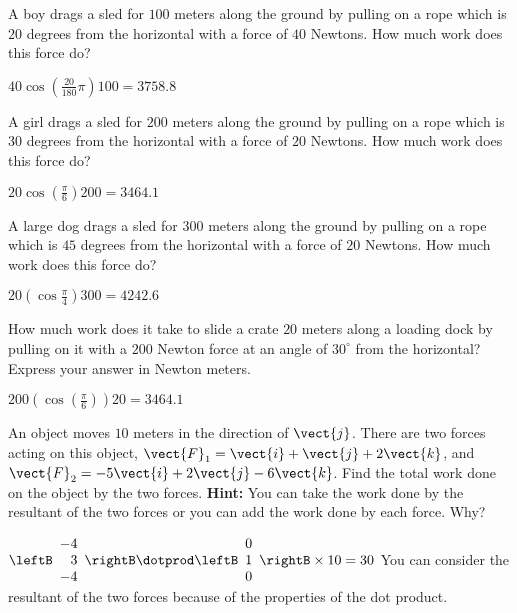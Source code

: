 \begin{enumialphparenastyle}

\begin{ex} A boy drags a sled for $100$ meters along the ground by pulling on a rope
which is $20$ degrees from the horizontal with a force of $40$ Newtons. How much
work does this force do?
\begin{sol}
$40\cos \left( \frac{20}{180}\pi \right)100=3758.8  $
\end{sol}
\end{ex}

\begin{ex} A girl drags a sled for $200$ meters along the ground by pulling on a rope
which is $30$ degrees from the horizontal with a force of $20$ Newtons. How much
work does this force do?
\begin{sol}
$20\cos \left( \frac{\pi }{6}\right)200= 3464.1 $
\end{sol}
\end{ex}

\begin{ex} A large dog drags a sled for $300$ meters along the ground by pulling on a
rope which is $45$ degrees from the horizontal with a force of $20$ Newtons. How
much work does this force do?
\begin{sol}
 $20\left( \cos \frac{\pi }{4}\right)300=4242.6 $
\end{sol}
\end{ex}

\begin{ex} How much work does it take to slide a crate $20$ meters
along a loading dock by pulling on it with a $200$ Newton force at an angle of
$30^{\circ }$ from the horizontal? Express your answer in Newton meters. 
\begin{sol}
$200\left( \cos \left( \frac{\pi }{6}\right) \right) 20= 3464.1$
\end{sol}
\end{ex}

\begin{ex} An object moves $10$ meters in the direction of $\vect{j}$. There are
two forces acting on this object, $\vect{F}_{1}=\vect{i}+\vect{j}+
2\vect{k}$, and $\vect{F}_{2}=-5\vect{i}+2\vect{j}-6\vect{k}$. Find
the total work done on the object by the two forces. \textbf{Hint: }You can
take the work done by the resultant of the two forces or you can add the
work done by each force. Why?
\begin{sol}
 $\leftB \begin{array}{r}
 -4 \\
3 \\
-4
\end{array}
\rightB \dotprod \leftB \begin{array}{r}
0 \\
1 \\
0
\end{array}
\rightB \times 10= 30$ You can consider the resultant of the
two forces because of the properties of the dot product.
\end{sol}
\end{ex}


\end{enumialphparenastyle}
